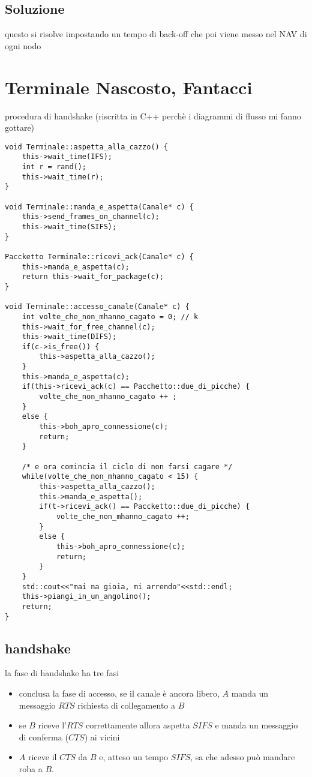 \documentclass[11pt]{article}
\begin{document}
\subsection{Soluzione}
\label{sec:orgd4e0092}
questo si risolve impostando un tempo di back-off che poi viene messo nel NAV di ogni nodo


\section{Terminale Nascosto, Fantacci}
\label{sec:org0e6927c}
procedura di handshake (riscritta in C++ perchè i diagrammi di flusso mi fanno gottare)
\begin{verbatim}
void Terminale::aspetta_alla_cazzo() {
    this->wait_time(IFS);
    int r = rand();
    this->wait_time(r);
}

void Terminale::manda_e_aspetta(Canale* c) {
    this->send_frames_on_channel(c);
    this->wait_time(SIFS);
}

Paccketto Terminale::ricevi_ack(Canale* c) {
    this->manda_e_aspetta(c);
    return this->wait_for_package(c);
}

void Terminale::accesso_canale(Canale* c) {
    int volte_che_non_mhanno_cagato = 0; // k
    this->wait_for_free_channel(c);
    this->wait_time(DIFS);
    if(c->is_free()) {
        this->aspetta_alla_cazzo();
    }
    this->manda_e_aspetta(c);
    if(this->ricevi_ack(c) == Pacchetto::due_di_picche) {
        volte_che_non_mhanno_cagato ++ ;
    }
    else {
        this->boh_apro_connessione(c);
        return;
    }

    /* e ora comincia il ciclo di non farsi cagare */
    while(volte_che_non_mhanno_cagato < 15) {
        this->aspetta_alla_cazzo();
        this->manda_e_aspetta();
        if(t->ricevi_ack() == Paccketto::due_di_picche) {
            volte_che_non_mhanno_cagato ++;
        }
        else {
            this->boh_apro_connessione(c);
            return;
        }
    }
    std::cout<<"mai na gioia, mi arrendo"<<std::endl;
    this->piangi_in_un_angolino();
    return;
}
\end{verbatim}

\subsection{handshake}
\label{sec:orgf998868}
la fase di handshake ha tre fasi
\begin{itemize}
\item conclusa la fase di accesso, se il canale è ancora libero, \(A\) manda un messaggio \(RTS\) richiesta di collegamento a \(B\)
\item se \(B\) riceve l'\(RTS\) correttamente allora aspetta \(SIFS\) e manda un messaggio di conferma (\(CTS\)) ai vicini
\item \(A\) riceve il \(CTS\) da \(B\) e, atteso un tempo \(SIFS\), sa che adesso può mandare roba a \(B\).
\end{itemize}
\end{document}
